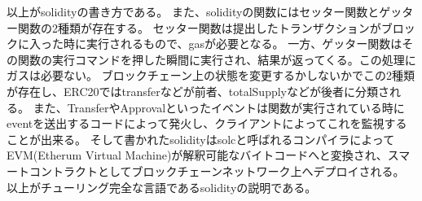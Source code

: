 以上がsolidityの書き方である。
また、solidityの関数にはセッター関数とゲッター関数の2種類が存在する。
セッター関数は提出したトランザクションがブロックに入った時に実行されるもので、gasが必要となる。
一方、ゲッター関数はその関数の実行コマンドを押した瞬間に実行され、結果が返ってくる。この処理にガスは必要ない。
ブロックチェーン上の状態を変更するかしないかでこの2種類が存在し、ERC20ではtransferなどが前者、totalSupplyなどが後者に分類される。
また、TransferやApprovalといったイベントは関数が実行されている時にeventを送出するコードによって発火し、クライアントによってこれを監視することが出来る。
そして書かれたsolidityはsolcと呼ばれるコンパイラによってEVM(Etherum Virtual Machine)が解釈可能なバイトコードへと変換され、スマートコントラクトとしてブロックチェーンネットワーク上へデプロイされる。
以上がチューリング完全な言語であるsolidityの説明である。

